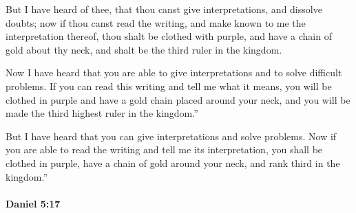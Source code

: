 			\begin{versebox}
					\item[BHS] 
					\item[LXX] 
					\item[ASV] But I have heard of thee, that thou canst give interpretations, and dissolve doubts; now if thou canst read the writing, and make known to me the interpretation thereof, thou shalt be clothed with purple, and have a chain of gold about thy neck, and shalt be the third ruler in the kingdom.
					\item[NIV] Now I have heard that you are able to give interpretations and to solve difficult problems. If you can read this writing and tell me what it means, you will be clothed in purple and have a gold chain placed around your neck, and you will be made the third highest ruler in the kingdom.”
					\item[NRSV] But I have heard that you can give interpretations and solve problems. Now if you are able to read the writing and tell me its interpretation, you shall be clothed in purple, have a chain of gold around your neck, and rank third in the kingdom.”
			\end{versebox}

		\paragraph{Daniel 5:17} %
			\label{DANIEL-5-17}

